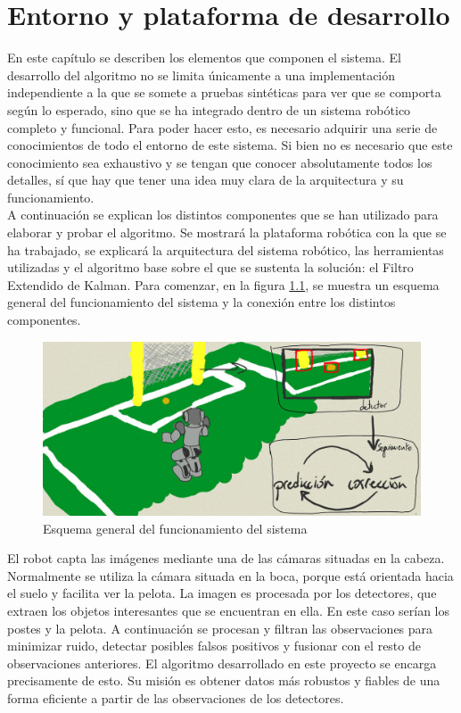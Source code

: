 \chapter{Entorno y plataforma de desarrollo}
\label{cap:entorno}

En este capítulo se describen los elementos que componen el sistema. El desarrollo del algoritmo no se limita únicamente a una implementación independiente a la que se somete a pruebas sintéticas para ver que se comporta según lo esperado, sino que se ha integrado dentro de un sistema robótico completo y funcional. Para poder hacer esto, es necesario adquirir una serie de conocimientos de todo el entorno de este sistema. Si bien no es necesario que este conocimiento sea exhaustivo y se tengan que conocer absolutamente todos los detalles, sí que hay que tener una idea muy clara de la arquitectura y su funcionamiento. \\

A continuación se explican los distintos componentes que se han utilizado para elaborar y probar el algoritmo. Se mostrará la plataforma robótica con la que se ha trabajado, se explicará la arquitectura del sistema robótico, las herramientas utilizadas y el algoritmo base sobre el que se sustenta la solución: el Filtro Extendido de Kalman. Para comenzar, en la figura \ref{fig:sistema}, se muestra un esquema general del funcionamiento del sistema y la conexión entre los distintos componentes. \\

\begin{figure} [h]
  \begin{center}
    \includegraphics[width=15cm]{img/cap3/sistema}
  \end{center}
  \caption{Esquema general del funcionamiento del sistema}
  \label{fig:sistema}
\end{figure}

El robot capta las imágenes mediante una de las cámaras situadas en la cabeza. Normalmente se utiliza la cámara situada en la boca, porque está orientada hacia el suelo y facilita ver la pelota. La imagen es procesada por los detectores, que extraen los objetos interesantes que se encuentran en ella. En este caso serían los postes y la pelota. A continuación se procesan y filtran las observaciones para minimizar ruido, detectar posibles falsos positivos y fusionar con el resto de observaciones anteriores. El algoritmo desarrollado en este proyecto se encarga precisamente de esto. Su misión es obtener datos más robustos y fiables de una forma eficiente a partir de las observaciones de los detectores.\\

